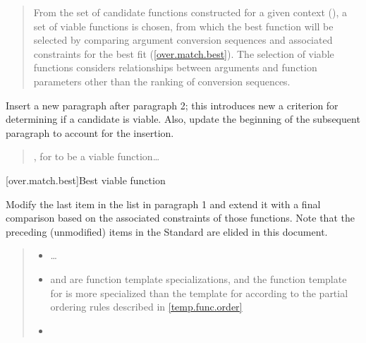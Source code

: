 \begin{quote}
\pnum
From the set of candidate functions constructed for a given context 
(), a set of viable functions is chosen, from which 
the best function will be selected by comparing argument conversion 
sequences and associated constraints for the best fit 
(\ref{over.match.best}).
%
The selection of viable functions considers  relationships between arguments and function 
parameters other than the ranking of conversion sequences.
\end{quote}

Insert a new paragraph after paragraph 2; this introduces new a criterion for 
determining if a candidate is viable. Also, update the beginning of the 
subsequent paragraph to account for the insertion.

\begin{quote}
\setcounter{Paras}{2}
\pnum
{}

\pnum
{}, for  to be a viable function\ldots
\end{quote}

[over.match.best]{Best viable function}

Modify the last item in the list in paragraph 1 and extend it with a final
comparison based on the associated constraints of those functions. Note that 
the preceding (unmodified) items in the \Cpp Standard are elided in this
document.

\begin{quote}
\begin{itemize}
\item \ldots

\item {} and  are function template specializations, and 
the function template for  is more specialized than the template 
for  according to the partial ordering rules described in
\ref{temp.func.order}

\item
{}
\end{itemize}
\end{quote}


